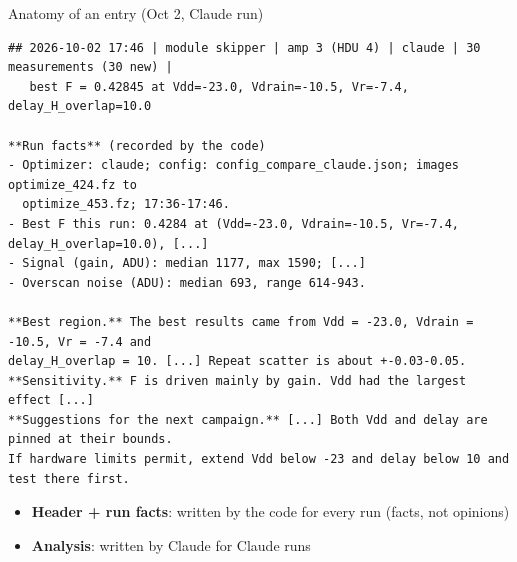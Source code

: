 \documentclass[aspectratio=169,10pt]{beamer}
\begin{document}
\begin{frame}[fragile]{Anatomy of an entry (Oct 2, Claude run)}
\begin{lstlisting}
## 2026-10-02 17:46 | module skipper | amp 3 (HDU 4) | claude | 30 measurements (30 new) |
   best F = 0.42845 at Vdd=-23.0, Vdrain=-10.5, Vr=-7.4, delay_H_overlap=10.0

**Run facts** (recorded by the code)
- Optimizer: claude; config: config_compare_claude.json; images optimize_424.fz to
  optimize_453.fz; 17:36-17:46.
- Best F this run: 0.4284 at (Vdd=-23.0, Vdrain=-10.5, Vr=-7.4, delay_H_overlap=10.0), [...]
- Signal (gain, ADU): median 1177, max 1590; [...]
- Overscan noise (ADU): median 693, range 614-943.

**Best region.** The best results came from Vdd = -23.0, Vdrain = -10.5, Vr = -7.4 and
delay_H_overlap = 10. [...] Repeat scatter is about +-0.03-0.05.
**Sensitivity.** F is driven mainly by gain. Vdd had the largest effect [...]
**Suggestions for the next campaign.** [...] Both Vdd and delay are pinned at their bounds.
If hardware limits permit, extend Vdd below -23 and delay below 10 and test there first.
\end{lstlisting}
  \small
  \begin{itemize}
    \item \textbf{Header + run facts}: written by the code for every run (facts, not opinions)
    \item \textbf{Analysis}: written by Claude for Claude runs
  \end{itemize}
\end{frame}
\end{document}
